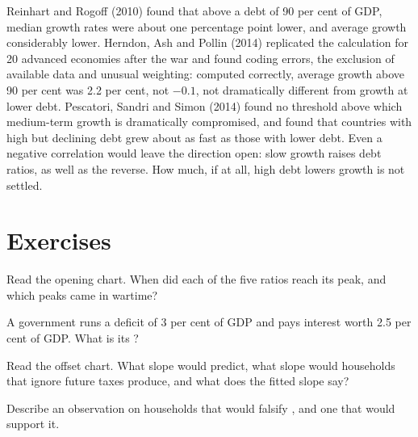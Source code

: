 \begin{debate}
Reinhart and Rogoff (2010) found that above a debt of 90 per cent of GDP, median growth rates were about one percentage point
lower, and average growth considerably lower. Herndon, Ash and Pollin (2014) replicated the calculation for 20 advanced
economies after the war and found coding errors, the exclusion of available data and unusual weighting: computed
correctly, average growth above 90 per cent was 2.2 per cent, not $-0.1$, not dramatically different from growth at lower debt.
Pescatori, Sandri and Simon (2014) found no threshold above which medium-term growth is dramatically compromised, and found
that countries with high but declining debt grew about as fast as those with lower debt. Even a negative correlation would
leave the direction open: slow growth raises debt ratios, as well as the reverse. How much, if at all, high debt lowers
growth is not settled.
\end{debate}

\section{Exercises}\label{sec:b2:government-debt:exercises}

\begin{exercise}[$\star$]\label{exo:b2:government-debt:1}
Read the opening chart. When did each of the five ratios reach its peak, and which peaks came in wartime?
\end{exercise}

\begin{exercise}[$\star$]\label{exo:b2:government-debt:2}
A government runs a deficit of 3 per cent of GDP and pays interest worth 2.5 per cent of GDP. What is its ?
\end{exercise}

\begin{exercise}[$\star$]\label{exo:b2:government-debt:3}
Read the offset chart. What slope would  predict, what slope would households that ignore future
taxes produce, and what does the fitted slope say?
\end{exercise}

\begin{exercise}[$\star$]\label{exo:b2:government-debt:4}
Describe an observation on households that would falsify , and one that would support it.
\end{exercise}

